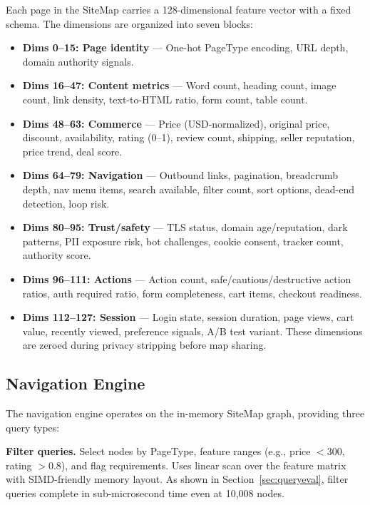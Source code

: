 \documentclass[10pt, twocolumn]{article}
\begin{document}
Each page in the SiteMap carries a 128-dimensional feature vector with a fixed schema. The dimensions are organized into seven blocks:

\begin{itemize}[nosep, leftmargin=*]
  \item \textbf{Dims 0--15: Page identity} --- One-hot PageType encoding, URL depth, domain authority signals.
  \item \textbf{Dims 16--47: Content metrics} --- Word count, heading count, image count, link density, text-to-HTML ratio, form count, table count.
  \item \textbf{Dims 48--63: Commerce} --- Price (USD-normalized), original price, discount, availability, rating (0--1), review count, shipping, seller reputation, price trend, deal score.
  \item \textbf{Dims 64--79: Navigation} --- Outbound links, pagination, breadcrumb depth, nav menu items, search available, filter count, sort options, dead-end detection, loop risk.
  \item \textbf{Dims 80--95: Trust/safety} --- TLS status, domain age/reputation, dark patterns, PII exposure risk, bot challenges, cookie consent, tracker count, authority score.
  \item \textbf{Dims 96--111: Actions} --- Action count, safe/cautious/destructive action ratios, auth required ratio, form completeness, cart items, checkout readiness.
  \item \textbf{Dims 112--127: Session} --- Login state, session duration, page views, cart value, recently viewed, preference signals, A/B test variant. These dimensions are zeroed during privacy stripping before map sharing.
\end{itemize}

\subsection{Navigation Engine}
\label{sec:navigation}

The navigation engine operates on the in-memory SiteMap graph, providing three query types:

\textbf{Filter queries.} Select nodes by PageType, feature ranges (e.g., price $< 300$, rating $> 0.8$), and flag requirements. Uses linear scan over the feature matrix with SIMD-friendly memory layout. As shown in Section~\ref{sec:queryeval}, filter queries complete in sub-microsecond time even at 10{,}008 nodes.
\end{document}
